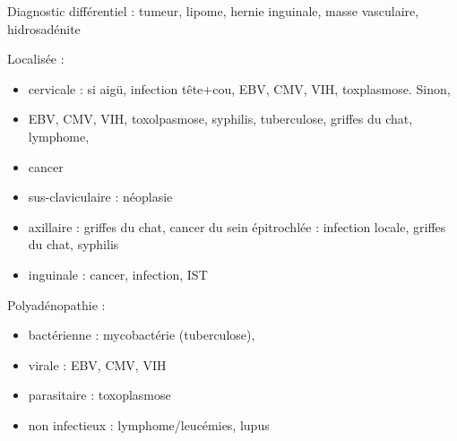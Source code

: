 \documentclass{article}
\begin{document}
{Diagnostic différentiel : tumeur, lipome, hernie inguinale, masse vasculaire,
hidrosadénite

Localisée :
\begin{itemize}
\item cervicale : si aigü, infection tête+cou, EBV, CMV, VIH, toxplasmose. Sinon,
\item EBV, CMV, VIH, toxolpasmose, syphilis, tuberculose, griffes du chat, lymphome,
\item cancer
\item sus-claviculaire : néoplasie
\item axillaire : griffes du chat, cancer du sein
 épitrochlée : infection locale, griffes du chat, syphilis
\item inguinale : cancer, infection, IST
\end{itemize}

Polyadénopathie :
\begin{itemize}
\item  bactérienne : mycobactérie (tuberculose),
\item  virale : EBV, CMV, VIH
\item  parasitaire : toxoplasmose
\item  non infectieux : lymphome/leucémies, lupus
\end{itemize}




}
\end{document}
